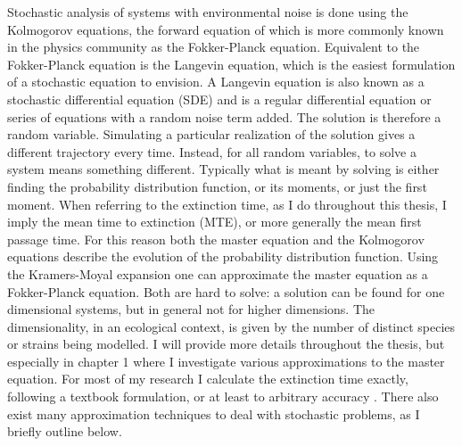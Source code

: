 \iffalse
Stochastic analysis of systems with environmental noise is done using the Kolmogorov equations, the forward equation of which is more commonly known in the physics community as the Fokker-Planck equation. 
Equivalent to the Fokker-Planck equation is the Langevin equation, which is the easiest formulation of a stochastic equation to envision. 
A Langevin equation is also known as a stochastic differential equation (SDE) and is a regular differential equation or series of equations with a random noise term added. 
The solution is therefore a random variable. 
Simulating a particular realization of the solution gives a different trajectory every time. 
Instead, for all random variables, to solve a system means something different. 
Typically what is meant by solving is either finding the probability distribution function, or its moments, or just the first moment. 
When referring to the extinction time, as I do throughout this thesis, I imply the mean time to extinction (MTE), or more generally the mean first passage time. 
For this reason both the master equation and the Kolmogorov equations describe the evolution of the probability distribution function. 
Using the Kramers-Moyal expansion one can approximate the master equation as a Fokker-Planck equation. 
Both are hard to solve: a solution can be found for one dimensional systems, but in general not for higher dimensions. 
The dimensionality, in an ecological context, is given by the number of distinct species or strains being modelled. 
I will provide more details throughout the thesis, but especially in chapter 1 where I investigate various approximations to the master equation. %
For most of my research I calculate the extinction time exactly, following a textbook formulation, or at least to arbitrary accuracy \cite{Nisbet1982,Norden1982}. 
There also exist many approximation techniques to deal with stochastic problems, as I briefly outline below. %

